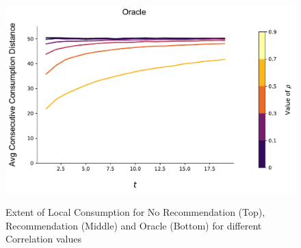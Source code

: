 \documentclass[sigconf, anonymous, review]{acmart}
\begin{document}
\begin{figure}[t]
\includegraphics[width=\linewidth]{figures/rho_consumption_dist_N_200T_20_omni.pdf}\\
\caption{Extent of Local Consumption for No Recommendation (Top), Recommendation (Middle) and Oracle (Bottom) for different Correlation values}
\label{fig:local_consumption_across_rho}
\end{figure}
\end{document}
